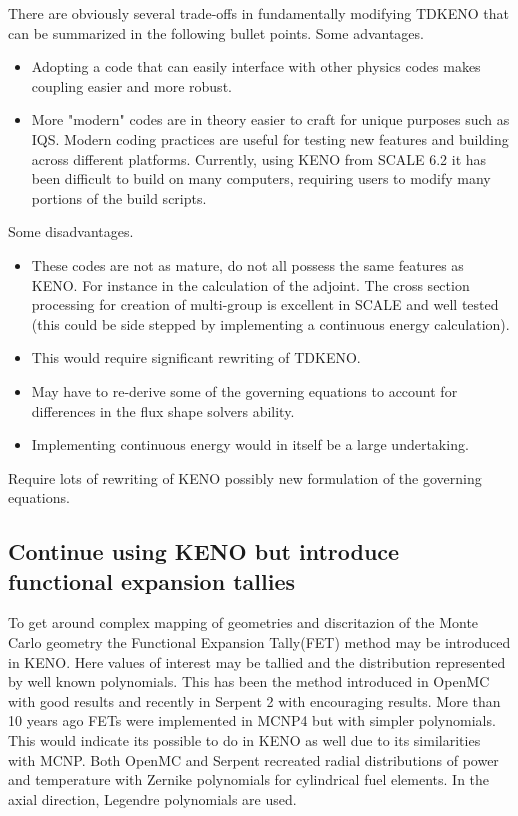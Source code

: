 \documentclass[11pt]{article}
\begin{document}
	There are obviously several trade-offs in fundamentally modifying TDKENO that can be summarized in the following bullet points.
	Some advantages.  
	\begin{itemize}
	\item Adopting a code that can easily interface with other physics codes makes coupling easier and more robust.  
	\item More "modern" codes are in theory easier to craft for unique purposes such as IQS.  Modern coding practices are useful for testing new features and building across different platforms.  Currently, using KENO from SCALE 6.2 it has been difficult to build on many computers, requiring users to modify many portions of the build scripts. 
	\end{itemize}		
	Some disadvantages.
	\begin{itemize}
	\item These codes are not as mature, do not all possess the same features as KENO.  For instance in the calculation of the adjoint. The cross section processing for creation of multi-group is excellent in SCALE and well tested (this could be side stepped by implementing a continuous energy calculation).
	\item This would require significant rewriting of TDKENO.
	\item May have to re-derive some of the governing equations to account for differences in the flux shape solvers ability.
	\item Implementing continuous energy would in itself be a large undertaking.  
	\end{itemize}
	  Require lots of rewriting of KENO possibly new formulation of the governing equations.

\subsection{Continue using KENO but introduce functional expansion tallies}
To get around complex mapping of geometries and discritazion of the Monte Carlo geometry the Functional Expansion Tally(FET) method may be introduced in KENO.  Here values of interest may be tallied and the distribution represented by well known polynomials.  This has been the method introduced in OpenMC with good results and recently in Serpent 2 with encouraging results.  More than 10 years ago FETs were implemented in MCNP4 \cite{griesheimer2004two} but with simpler polynomials. This would indicate its possible to do in KENO as well due to its similarities with MCNP. Both OpenMC and Serpent recreated radial distributions of power and temperature with Zernike polynomials  for cylindrical fuel elements. In the axial direction, Legendre polynomials are used. 
\end{document}
